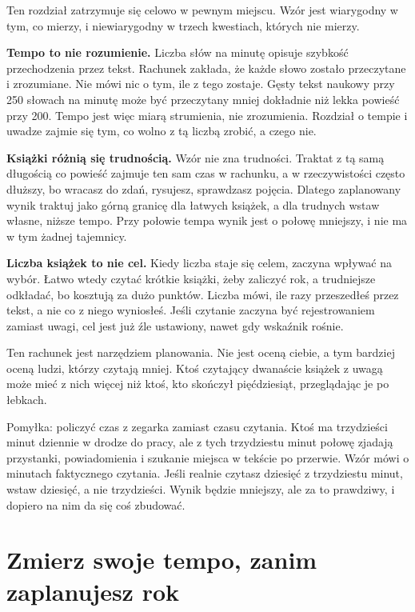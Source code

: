 Ten rozdział zatrzymuje się celowo w pewnym miejscu. Wzór jest wiarygodny w tym, co mierzy, i niewiarygodny w trzech kwestiach, których nie mierzy.

\textbf{Tempo to nie rozumienie.} Liczba słów na minutę opisuje szybkość przechodzenia przez tekst. Rachunek zakłada, że każde słowo zostało przeczytane i zrozumiane. Nie mówi nic o tym, ile z tego zostaje. Gęsty tekst naukowy przy 250 słowach na minutę może być przeczytany mniej dokładnie niż lekka powieść przy 200. Tempo jest więc miarą strumienia, nie zrozumienia. Rozdział o tempie i uwadze zajmie się tym, co wolno z tą liczbą zrobić, a czego nie.

\textbf{Książki różnią się trudnością.} Wzór nie zna trudności. Traktat z tą samą długością co powieść zajmuje ten sam czas w rachunku, a w rzeczywistości często dłuższy, bo wracasz do zdań, rysujesz, sprawdzasz pojęcia. Dlatego zaplanowany wynik traktuj jako górną granicę dla łatwych książek, a dla trudnych wstaw własne, niższe tempo. Przy połowie tempa wynik jest o połowę mniejszy, i nie ma w tym żadnej tajemnicy.

\textbf{Liczba książek to nie cel.} Kiedy liczba staje się celem, zaczyna wpływać na wybór. Łatwo wtedy czytać krótkie książki, żeby zaliczyć rok, a trudniejsze odkładać, bo kosztują za dużo \glqq punktów\grqq{}. Liczba mówi, ile razy przeszedłeś przez tekst, a nie co z niego wyniosłeś. Jeśli czytanie zaczyna być rejestrowaniem zamiast uwagi, cel jest już źle ustawiony, nawet gdy wskaźnik rośnie.

\begin{uwaga}
Ten rachunek jest narzędziem planowania. Nie jest oceną ciebie, a tym bardziej oceną ludzi, którzy czytają mniej. Ktoś czytający dwanaście książek z uwagą może mieć z nich więcej niż ktoś, kto skończył pięćdziesiąt, przeglądając je po łebkach.
\end{uwaga}

\begin{falle}
Pomyłka: policzyć czas z zegarka zamiast czasu czytania. Ktoś ma trzydzieści minut dziennie w drodze do pracy, ale z tych trzydziestu minut połowę zjadają przystanki, powiadomienia i szukanie miejsca w tekście po przerwie. Wzór mówi o minutach faktycznego czytania. Jeśli realnie czytasz dziesięć z trzydziestu minut, wstaw dziesięć, a nie trzydzieści. Wynik będzie mniejszy, ale za to prawdziwy, i dopiero na nim da się coś zbudować.
\end{falle}

\section{Zmierz swoje tempo, zanim zaplanujesz rok}


